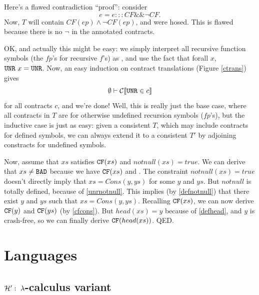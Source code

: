 \documentclass[preprint]{sigplanconf}
\begin{document}
{  Here's a flawed contradiction ``proof'': consider
  \[
  e = e ::: CF \&\& \lnot CF.
  \]
  Now, $T$ will contain $CF(ep) \land \lnot CF(ep)$, and were hosed.
  This is flawed because there is no $\lnot$ in the annotated
  contracts.

  OK, and actually this might be easy: we simply interpret all
  recursive function symbols (the $fp$'s for recursive $f$'s) as
  \unr{}, and use the fact that forall $x$, $\texttt{UNR}{}~x = \texttt{UNR}$.  Now,
  an easy induction on contract translations (Figure \ref{ctrans})
  gives \[ \emptyset \vdash \mathcal{C} \llbracket \texttt{UNR} \in c \rrbracket \] for all contracts $c$, and we're done!  Well, this is really just
  the base case, where all contracts in $T$ are for otherwise
  undefined recursion symbols ($fp$'s), but the inductive case is just
  as easy: given a consistent $T$, which may include contracts for
  defined symbols, we can always extend it to a consistent $T'$ by
  adjoining constracts for undefined symbols.

}

Now, assume that $xs$ satisfies
$\texttt{CF}(xs)$ and $notnull(xs) = true$.  We can derive that $xs \neq \texttt{BAD}$
because we have $\texttt{CF}(xs)$ and . The constraint
$notnull(xs) = true$ doesn't directly imply that $xs = Cons(y,ys)$ for
some $y$ and $ys$. But $notnull$ is totally defined, because of
\eqref{unrnotnull}. This implies (by \eqref{defnotnull}) that there exist
$y$ and $ys$ such that $xs = Cons(y,ys)$. Recalling $\texttt{CF}(xs)$, we can
now derive $\texttt{CF}(y)$ and $\texttt{CF}(ys)$ (by \eqref{cfcons}). But $head(xs) =
y$ because of \eqref{defhead}, and $y$ is crash-free, so we can finally
derive $\texttt{CF}(head(xs))$. QED.


\section{Languages}
\subsection{$\mathcal{H}':~\lambda$-calculus variant}
\end{document}
